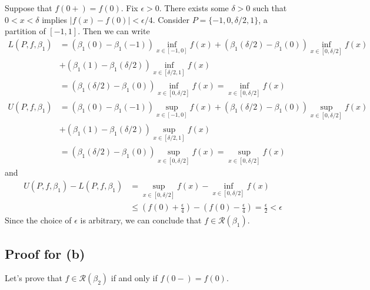\documentclass{scrartcl}
\begin{document}
Suppose that \(f(0+) = f(0)\).
Fix \(\epsilon > 0\).
There exists some \(\delta > 0\) such that \(0 < x < \delta\) implies \(|f(x) - f(0)| < \epsilon / 4\).
Consider \(P = \{-1, 0, \delta / 2, 1\}\), a partition of \([-1, 1]\).
Then we can write
\begin{align*}
  L(P, f, \beta_1) &= (\beta_1(0) - \beta_1(-1)) \inf_{x \in [-1, 0]} f(x) + (\beta_1(\delta / 2) - \beta_1(0)) \inf_{x \in [0, \delta / 2]} f(x) \\
                   &+ (\beta_1(1) - \beta_1(\delta / 2)) \inf_{x \in [\delta / 2, 1]} f(x) \\
                   &= (\beta_1(\delta / 2) - \beta_1(0)) \inf_{x \in [0, \delta / 2]} f(x) = \inf_{x \in [0, \delta / 2]} f(x) \\
  U(P, f, \beta_1) &= (\beta_1(0) - \beta_1(-1)) \sup_{x \in [-1, 0]} f(x) + (\beta_1(\delta / 2) - \beta_1(0)) \sup_{x \in [0, \delta / 2]} f(x) \\
                   &+ (\beta_1(1) - \beta_1(\delta / 2)) \sup_{x \in [\delta / 2, 1]} f(x) \\
                   &= (\beta_1(\delta / 2) - \beta_1(0)) \sup_{x \in [0, \delta / 2]} f(x) = \sup_{x \in [0, \delta / 2]} f(x)
\end{align*}
and
\begin{align*}
  U(P, f, \beta_1) - L(P, f, \beta_1)
  &= \sup_{x \in [0, \delta / 2]} f(x) - \inf_{x \in [0, \delta / 2]} f(x) \\
  &\leq \left( f(0) + \frac{\epsilon}{4} \right) - \left( f(0) - \frac{\epsilon}{4} \right)
  = \frac{\epsilon}{2}
  < \epsilon
\end{align*}
Since the choice of \(\epsilon\) is arbitrary, we can conclude that \(f \in \mathscr{R}(\beta_1)\).

\subsection{Proof for (b)}
Let's prove that \(f \in \mathscr{R}(\beta_2)\) if and only if \(f(0-) = f(0)\).
\end{document}
